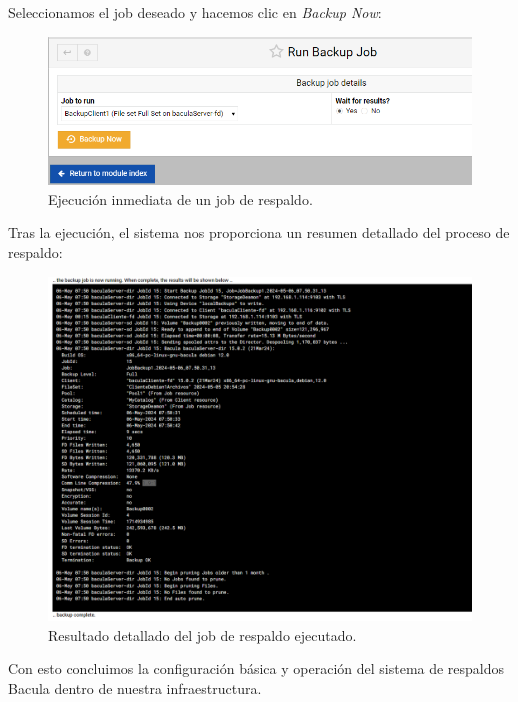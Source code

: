 Seleccionamos el job deseado y hacemos clic en \textit{Backup Now}:

\begin{figure}[H]
    \centering
    \includegraphics[width=0.5\linewidth]{instalacionBacula/backupnoww.png}
    \caption{Ejecución inmediata de un job de respaldo.}
\end{figure}

Tras la ejecución, el sistema nos proporciona un resumen detallado del proceso de respaldo:

\begin{figure}[H]
    \centering
    \includegraphics[width=0.5\linewidth]{instalacionBacula/salidajob1.png}
    \caption{Resultado detallado del job de respaldo ejecutado.}
\end{figure}

Con esto concluimos la configuración básica y operación del sistema de respaldos Bacula dentro de nuestra infraestructura.
